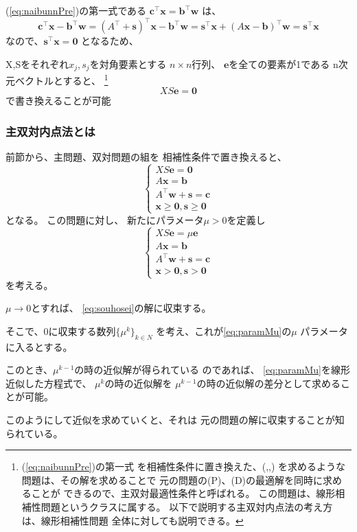 \documentclass[9pt]{ltjsreport}
\begin{document}
\begin{tcolorbox}[title=相補性条件]
(\ref{eq:naibunnPre})の第一式である
$\bm{c}^\top\bm{x}=\bm{b}^\top\bm{w}$
は、
\begin{equation}
    \bm{c}^\top\bm{x}-\bm{b}^\top\bm{w}
    =(A^\top+\bm{s})^\top\bm{x}-\bm{b}^\top\bm{w}
    =\bm{s}^\top\bm{x}+(A\bm{x}-\bm{b})^\top\bm{w}
    =\bm{s}^\top\bm{x}
\end{equation}
なので、$\bm{s}^\top\bm{x}=\bm{0}$
となるため、

X,Sをそれぞれ$x_j,s_j$を対角要素とする
$n\times n$行列、
$\bm{e}$を全ての要素が1である
n次元ベクトルとすると、
\footnote{(\ref{eq:naibunnPre})の第一式
を相補性条件に置き換えた、(,,)
を求めるような問題は、その解を求めることで
元の問題の(P)、(D)の最適解を同時に求めることが
できるので、主双対最適性条件と呼ばれる。
この問題は、線形相補性問題というクラスに属する。
以下で説明する主双対内点法の考え方は、線形相補性問題
全体に対しても説明できる。}
\begin{equation}
    XS\bm{e}=\bm{0}
\end{equation}
で書き換えることが可能
\end{tcolorbox}
\newpage
\subsubsection{主双対内点法とは}
前節から、主問題、双対問題の組を
相補性条件で置き換えると、
\begin{equation}
    \label{eq:souhosei}
    \begin{cases}
        XS\bm{e}=\bm{0}\\
        A\bm{x}=\bm{b}\\
        A^\top\bm{w}+\bm{s}=\bm{c}\\
        \bm{x}\ge\bm{0},\bm{s}\ge\bm{0}
    \end{cases}
\end{equation}
となる。
この問題に対し、
新たにパラメータ$\mu>0$を定義し
\begin{equation}
    \label{eq:paramMu}
    \begin{cases}
        XS\bm{e}=\mu\bm{e}\\
        A\bm{x}=\bm{b}\\
        A^\top\bm{w}+\bm{s}=\bm{c}\\
        \bm{x}>\bm{0},\bm{s}>\bm{0}
    \end{cases}
\end{equation}
を考える。

$\mu\longrightarrow 0$とすれば、
\ref{eq:souhosei}の解に収束する。

そこで、0に収束する数列$\{\mu^k\}_{k\in N}$
を考え、これが\ref{eq:paramMu}の$\mu$
パラメータに入るとする。


このとき、$\mu^{k-1}$の時の近似解が得られている
のであれば、
\ref{eq:paramMu}を線形近似した方程式で、
$\mu^k$の時の近似解を
$\mu^{k-1}$の時の近似解の差分として求めることが可能。

このようにして近似を求めていくと、それは
元の問題の解に収束することが知られている。
\end{document}
